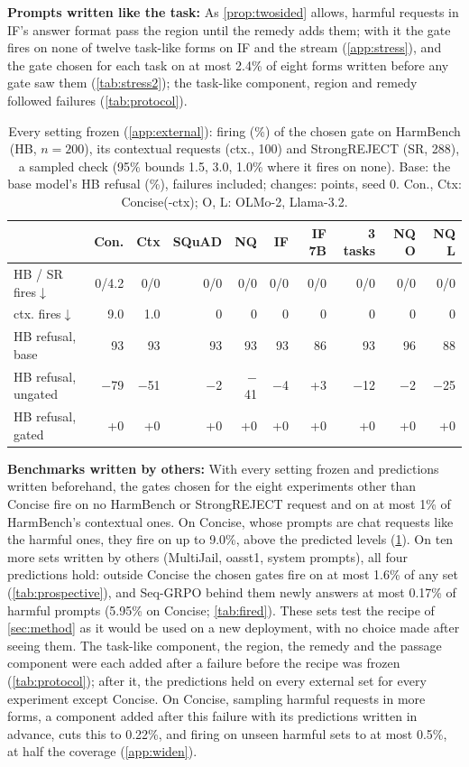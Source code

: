 \documentclass{article}
\theoremstyle{plain}
\theoremstyle{definition}
\theoremstyle{remark}
\begin{document}
\textbf{Prompts written like the task:} As \cref{prop:twosided} allows, harmful requests in IF's answer format pass
the region until the remedy adds them; with it the gate fires on none of twelve task-like forms on IF and the stream
(\cref{app:stress}), and the gate chosen for each task on at most 2.4\% of eight forms written before any gate saw
them (\cref{tab:stress2}); the task-like component, region and remedy followed failures (\cref{tab:protocol}).

\begin{table}[t]
\centering
\scriptsize
\setlength{\tabcolsep}{1.8pt}
\caption{Every setting frozen (\cref{app:external}): firing (\%) of the chosen gate on HarmBench (HB, $n=200$), its
contextual requests (ctx., 100) and StrongREJECT (SR, 288), a sampled check (95\% bounds 1.5, 3.0, 1.0\% where it fires on
none). Base: the base model's HB refusal (\%), failures included; changes: points, seed 0. Con., Ctx: Concise(-ctx); O, L:
OLMo-2, Llama-3.2.}
\label{tab:extmain}
\begin{tabular}{l rrrrrrrrr}
\toprule
 & Con. & Ctx & SQuAD & NQ & IF & IF 7B & 3 tasks & NQ O & NQ L \\
\midrule
HB / SR fires$\downarrow$ & 0/4.2 & 0/0 & 0/0 & 0/0 & 0/0 & 0/0 & 0/0 & 0/0 & 0/0 \\
ctx. fires$\downarrow$ & 9.0 & 1.0 & 0 & 0 & 0 & 0 & 0 & 0 & 0 \\
HB refusal, base & 93 & 93 & 93 & 93 & 93 & 86 & 93 & 96 & 88 \\
HB refusal, ungated & $-$79 & $-$51 & $-$2 & $-$41 & $-$4 & +3 & $-$12 & $-$2 & $-$25 \\
HB refusal, gated & +0 & +0 & +0 & +0 & +0 & +0 & +0 & +0 & +0 \\
\bottomrule
\end{tabular}
\end{table}

\textbf{Benchmarks written by others:} With every setting frozen and predictions written beforehand, the gates chosen
for the eight experiments other than Concise fire on no HarmBench or StrongREJECT request
\citep{mazeika2024harmbench,souly2024strongreject} and on at most 1\% of HarmBench's contextual ones. On Concise, whose
prompts are chat requests like the harmful ones, they fire on up to 9.0\%, above the predicted levels (\cref{tab:extmain}). On ten more sets written by others (MultiJail,
oasst1, system prompts), all four predictions hold: outside Concise the chosen gates fire on at most 1.6\% of any set (\cref{tab:prospective}), and Seq-GRPO behind them newly answers at most 0.17\% of harmful prompts (5.95\% on
Concise; \cref{tab:fired}). These sets test the recipe of \cref{sec:method} as it would be used on a new deployment, with no choice made
after seeing them. The task-like component, the region, the remedy and the passage component were each added after a
failure before the recipe was frozen (\cref{tab:protocol}); after it, the predictions held on every external
set for every experiment except Concise. On Concise, sampling harmful requests in more forms, a component added after this failure with its
predictions written in advance, cuts this to 0.22\%, and firing on unseen harmful sets to at most 0.5\%, at half the
coverage (\cref{app:widen}).
\end{document}
